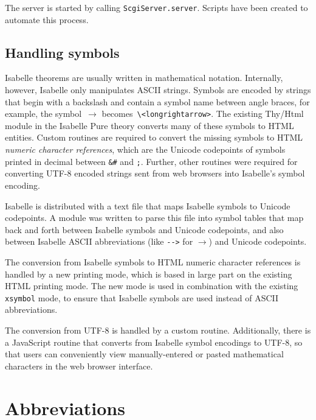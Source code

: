 \documentclass[a4paper,draft]{article} %
\begin{document}
The server is started by calling \texttt{ScgiServer.server}.
Scripts have been created to automate this process.

\subsection{Handling symbols}\label{sec:unicode}

Isabelle theorems are usually written in mathematical notation.
Internally, however, Isabelle only manipulates \acs{ASCII} strings.
Symbols are encoded by strings that begin with a backslash and contain a 
symbol name between angle braces, for example, the symbol~$\longrightarrow$ 
becomes~\verb+\<longrightarrow>+.
The existing Thy/Html module in the Isabelle Pure theory converts many of 
these symbols to \ac{HTML} entities.
Custom routines are required to convert the missing symbols to \ac{HTML} 
\emph{numeric character references}, which are the Unicode codepoints of 
symbols printed in decimal between \verb+&#+ and \verb+;+.
Further, other routines were required for converting \acs{UTF-8} encoded 
strings sent from web browsers into Isabelle's symbol encoding.

Isabelle is distributed with a text file that maps Isabelle symbols to 
Unicode codepoints.
A module was written to parse this file into symbol tables that map back and 
forth between Isabelle symbols and Unicode codepoints, and also between 
Isabelle \acs{ASCII} abbreviations (like \verb+-->+ for $\longrightarrow$) 
and Unicode codepoints.

The conversion from Isabelle symbols to \ac{HTML} numeric character 
references is handled by a new printing mode, which is based in large part 
on the existing \ac{HTML} printing mode.
The new mode is used in combination with the existing \texttt{xsymbol} mode, 
to ensure that Isabelle symbols are used instead of \acs{ASCII} 
abbreviations.

The conversion from \acs{UTF-8} is handled by a custom routine.
Additionally, there is a JavaScript routine that converts from Isabelle 
symbol encodings to \acs{UTF-8}, so that users can conveniently view 
manually-entered or pasted mathematical characters in the web browser 
interface.

\section{Abbreviations}\label{sec:abbr}

\begin{acronym}[SML/NJ] %
\end{acronym}
\end{document}
